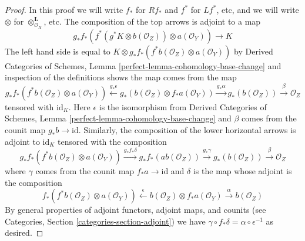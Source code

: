 \documentclass[10pt,a4paper]{amsart}
\theoremstyle{plain}
\theoremstyle{definition}
\theoremstyle{remark}
\numberwithin{equation}{subsection}
\begin{document}
\begin{proof}
In this proof we will write $f_*$ for $Rf_*$ and $f^*$ for $Lf^*$, etc,
and we will write $\otimes$ for $\otimes^\mathbf{L}_{\mathcal{O}_X}$, etc.
The composition of the top arrows is adjoint to a map
$$
g_*f_*(f^*(g^*K \otimes b(\mathcal{O}_Z)) \otimes a(\mathcal{O}_Y)) \to K
$$
The left hand side is equal to
$K \otimes g_*f_*(f^*b(\mathcal{O}_Z) \otimes a(\mathcal{O}_Y))$ by
Derived Categories of Schemes, Lemma
\ref{perfect-lemma-cohomology-base-change}
and inspection of the definitions shows the map comes from the map
$$
g_*f_*(f^*b(\mathcal{O}_Z) \otimes a(\mathcal{O}_Y))
\xleftarrow{g_*\epsilon}
g_*(b(\mathcal{O}_Z) \otimes f_*a(\mathcal{O}_Y)) \xrightarrow{g_*\alpha}
g_*(b(\mathcal{O}_Z)) \xrightarrow{\beta} \mathcal{O}_Z
$$
tensored with $\text{id}_K$. Here $\epsilon$ is the isomorphism from
Derived Categories of Schemes, Lemma
\ref{perfect-lemma-cohomology-base-change} and
$\beta$ comes from the counit map
$g_*b \to \text{id}$. Similarly, the composition of the lower
horizontal arrows is adjoint to $\text{id}_K$ tensored with the composition 
$$
g_*f_*(f^*b(\mathcal{O}_Z) \otimes a(\mathcal{O}_Y)) \xrightarrow{g_*f_*\delta}
g_*f_*(ab(\mathcal{O}_Z)) \xrightarrow{g_*\gamma}
g_*(b(\mathcal{O}_Z)) \xrightarrow{\beta}
\mathcal{O}_Z
$$
where $\gamma$ comes from the counit map $f_*a \to \text{id}$
and $\delta$ is the map whose adjoint is the composition
$$
f_*(f^*b(\mathcal{O}_Z) \otimes a(\mathcal{O}_Y))
\xleftarrow{\epsilon}
b(\mathcal{O}_Z) \otimes f_*a(\mathcal{O}_Y) \xrightarrow{\alpha}
b(\mathcal{O}_Z)
$$
By general properties of adjoint functors, adjoint maps, and counits
(see Categories, Section \ref{categories-section-adjoint})
we have $\gamma \circ f_*\delta = \alpha \circ \epsilon^{-1}$ as desired.
\end{proof}
\end{document}
